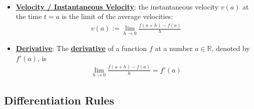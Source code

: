 \documentclass[reqno,11pt]{amsart}
\theoremstyle{definition}
\theoremstyle{remark}
\newcommand{\R}{\mathbb{R}}
\newcommand{\dfn}[1]{\underline{\textbf{#1}}}
\begin{document}
\begin{itemize}[noitemsep]
\begin{align}
	\end{align}
	\item \dfn{Velocity / Instantaneous Velocity}: the instantaneous velocity $v(a)$ at the time $t=a$ is the limit of the average velocities: 
	\begin{align}
		v(a) := \lim_{h \rightarrow 0} \frac{f(a+h) - f(a)}{h}	
	\end{align}
	\item \dfn{Derivative}: The \dfn{derivative} of a function $f$ at a number $a \in \R$, denoted by $f'(a)$, is 
	\begin{align}
		\lim_{h \rightarrow 0} \frac{f(a+h) - f(a)}{h} = f'(a)	
	\end{align}
\end{itemize}

\subsection{Differentiation Rules}
\end{document}
